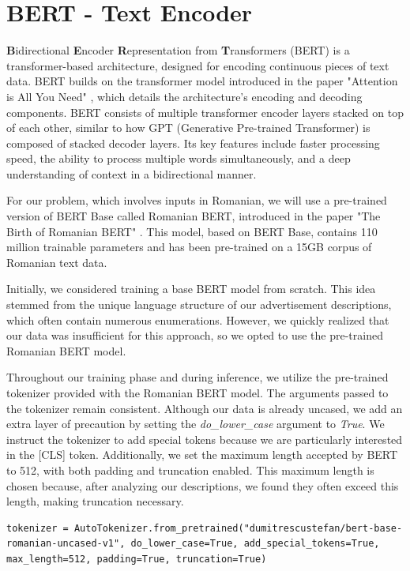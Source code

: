 \section{BERT - Text Encoder}
\label{sec:bert}
\textbf{B}idirectional \textbf{E}ncoder \textbf{R}epresentation from \textbf{T}ransformers (BERT) \cite{bert} is a transformer-based architecture, designed for encoding continuous pieces of text data. BERT builds on the transformer model introduced in the paper "Attention is All You Need" \cite{attention}, which details the architecture's encoding and decoding components. BERT consists of multiple transformer encoder layers stacked on top of each other, similar to how GPT (Generative Pre-trained Transformer) is composed of stacked decoder layers. Its key features include faster processing speed, the ability to process multiple words simultaneously, and a deep understanding of context in a bidirectional manner.

For our problem, which involves inputs in Romanian, we will use a pre-trained version of BERT Base called Romanian BERT, introduced in the paper "The Birth of Romanian BERT" \cite{dumitrescu-etal-2020-birth}. This model, based on BERT Base, contains 110 million trainable parameters and has been pre-trained on a 15GB corpus of Romanian text data.

Initially, we considered training a base BERT model from scratch. This idea stemmed from the unique language structure of our advertisement descriptions, which often contain numerous enumerations. However, we quickly realized that our data was insufficient for this approach, so we opted to use the pre-trained Romanian BERT model.

Throughout our training phase and during inference, we utilize the pre-trained tokenizer provided with the Romanian BERT model. The arguments passed to the tokenizer remain consistent. Although our data is already uncased, we add an extra layer of precaution by setting the \textit{do\_lower\_case} argument to \textit{True}. We instruct the tokenizer to add special tokens because we are particularly interested in the [CLS] token. Additionally, we set the maximum length accepted by BERT to 512, with both padding and truncation enabled. This maximum length is chosen because, after analyzing our descriptions, we found they often exceed this length, making truncation necessary.

\begin{lstlisting}
tokenizer = AutoTokenizer.from_pretrained("dumitrescustefan/bert-base-romanian-uncased-v1", do_lower_case=True, add_special_tokens=True, max_length=512, padding=True, truncation=True)
\end{lstlisting}

